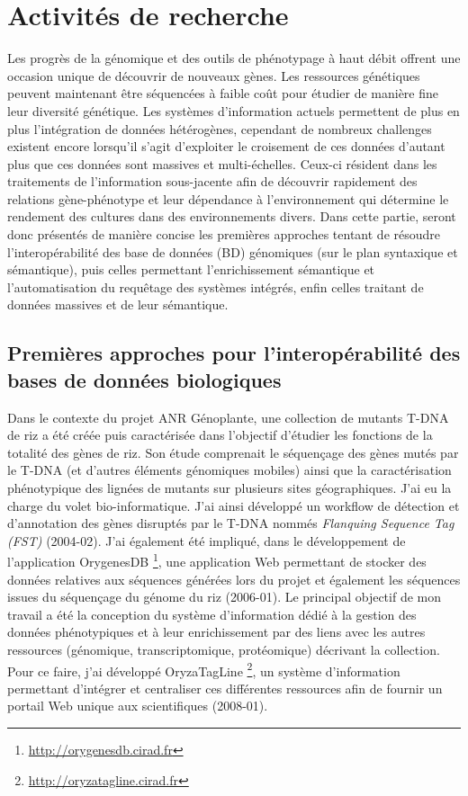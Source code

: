 \section{Activités de recherche}

Les progrès de la génomique et des outils de phénotypage à haut débit offrent une occasion unique de découvrir de nouveaux gènes. Les ressources génétiques peuvent maintenant être séquencées à faible coût pour étudier de manière fine leur diversité génétique. Les systèmes d'information actuels permettent de plus en plus l'intégration de données hétérogènes, cependant de nombreux challenges existent encore lorsqu'il s'agit d'exploiter le croisement de ces données d'autant plus que ces données sont massives et multi-échelles. Ceux-ci résident dans les traitements de l'information sous-jacente afin de découvrir rapidement des relations gène-phénotype et leur dépendance à l’environnement qui détermine le rendement des cultures dans des environnements divers.
Dans cette partie, seront donc présentés de manière concise les premières approches tentant de résoudre l'interopérabilité des base de données (BD) génomiques (sur le plan syntaxique et sémantique), puis celles permettant l'enrichissement sémantique et l'automatisation du requêtage des systèmes intégrés, enfin celles traitant de données massives et de leur sémantique.

\subsection*{Premières approches pour l’interopérabilité des bases de données biologiques}\label{these}

Dans le contexte du projet ANR Génoplante, une collection de mutants T-DNA de riz a été créée puis caractérisée dans l'objectif d'étudier les fonctions de la totalité des gènes de riz. Son étude comprenait le séquençage des gènes mutés par le T-DNA (et d'autres éléments génomiques mobiles) ainsi que la caractérisation phénotypique des lignées de mutants sur plusieurs sites géographiques. J'ai eu la charge du volet bio-informatique. J'ai ainsi développé un workflow de détection et d'annotation des  gènes disruptés par le T-DNA nommés \textit{Flanquing Sequence Tag (FST)}  (2004-02). J'ai également été impliqué, dans le développement de l'application OrygenesDB \footnote{\url{http://orygenesdb.cirad.fr}}, une application Web permettant de stocker des données relatives aux séquences générées lors du projet et également les séquences issues du séquençage du génome du riz (2006-01). Le principal objectif de mon travail a été la conception du système d'information dédié à la gestion des données phénotypiques et à leur enrichissement par des liens avec les autres ressources (génomique, transcriptomique, protéomique) décrivant la collection. Pour ce faire, j’ai développé OryzaTagLine \footnote{\url{http://oryzatagline.cirad.fr}}, un système d’information permettant d’intégrer et centraliser ces différentes ressources afin de fournir un portail Web unique aux scientifiques (2008-01).\\

